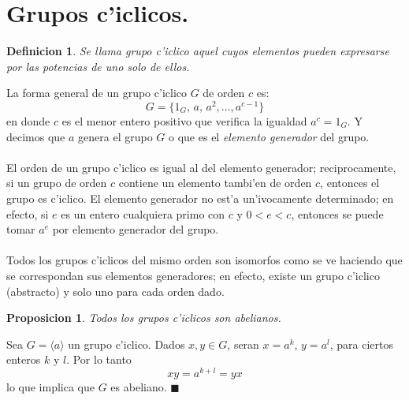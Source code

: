 \documentclass[a4paper,openright,12pt]{report}
\numberwithin{equation}{section} %
\newtheorem{proposicion}{Proposicion}[section] %
\newtheorem{definicion}{Definicion}[section] %
\newenvironment{proof}{\noindent{\it Demostracion:}}{\hfill$\blacksquare$} %
\begin{document}
\section{Grupos c'iclicos.}
\begin{definicion}
Se llama grupo c'iclico aquel cuyos elementos pueden expresarse por las potencias de uno solo de ellos.
\end{definicion}
La forma general de un grupo c'iclico $G$ de orden $c$ es:
\[
G=\{ 1_{G},\, a, \, a^{2},\ldots, a^{c-1} \}
\]
en donde $c$ es el menor entero positivo que verifica la igualdad $a^{c}=1_{G}$. Y decimos que $a$ genera el grupo $G$ o que es el \textit{elemento generador} del grupo.\\
\\
El orden de un grupo c'iclico es igual al del elemento generador; reciprocamente, si un grupo de orden $c$ contiene un elemento tambi'en de orden $c$, entonces el grupo es c'iclico. El elemento generador no est'a un'ivocamente determinado; en efecto, si $e$ es un entero cualquiera primo con $c$ y $0<e<c$, entonces se puede tomar $a^{e}$ por elemento generador del grupo.\\
\\
Todos los grupos c'iclicos del mismo orden son isomorfos como se ve haciendo que se correspondan sus elementos generadores; en efecto, existe un grupo c'iclico (abstracto) y solo uno para cada orden dado.
\begin{proposicion}
Todos los grupos c'iclicos son abelianos.
\end{proposicion}
\begin{proof}
Sea $G=\langle a \rangle$ un grupo c'iclico. Dados $x,y \in G$, seran $x=a^{k}$, $y=a^{l}$, para ciertos enteros $k$ y $l$. Por lo tanto
\[
xy=a^{k+l}=yx
\]
lo que implica que $G$ es abeliano.
\end{proof}
\end{document}
